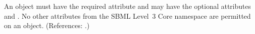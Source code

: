 An \AssignmentRule object must have the required attribute 
and may have the optional attributes  and .
No other attributes from the SBML Level~3 Core namespace are permitted on
an \AssignmentRule object.  (References: .)
